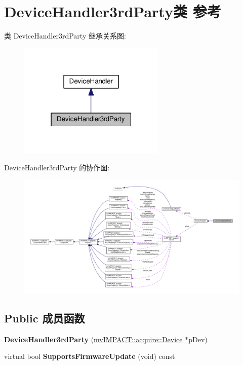 \hypertarget{class_device_handler3rd_party}{\section{Device\+Handler3rd\+Party类 参考}
\label{class_device_handler3rd_party}
}


类 Device\+Handler3rd\+Party 继承关系图\+:
\nopagebreak
\begin{figure}[H]
\begin{center}
\leavevmode
\includegraphics[width=198pt]{class_device_handler3rd_party__inherit__graph}
\end{center}
\end{figure}


Device\+Handler3rd\+Party 的协作图\+:
\nopagebreak
\begin{figure}[H]
\begin{center}
\leavevmode
\includegraphics[width=350pt]{class_device_handler3rd_party__coll__graph}
\end{center}
\end{figure}
\subsection*{Public 成员函数}
\begin{DoxyCompactItemize}
\item 
\hypertarget{class_device_handler3rd_party_a1eab7ef7f2f05db38d1490f7ddfad3f8}{{\bfseries Device\+Handler3rd\+Party} (\hyperlink{classmv_i_m_p_a_c_t_1_1acquire_1_1_device}{mv\+I\+M\+P\+A\+C\+T\+::acquire\+::\+Device} $\ast$p\+Dev)}\label{class_device_handler3rd_party_a1eab7ef7f2f05db38d1490f7ddfad3f8}

\item 
\hypertarget{class_device_handler3rd_party_a8c28d43894b9b739471fbc29a688bf84}{virtual bool {\bfseries Supports\+Firmware\+Update} (void) const }\label{class_device_handler3rd_party_a8c28d43894b9b739471fbc29a688bf84}

\end{DoxyCompactItemize}
